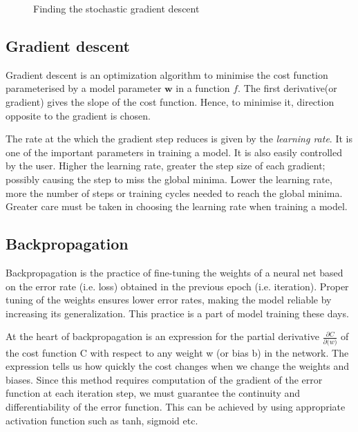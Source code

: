 \begin{figure}
	\centering
    \def\svgwidth{0.6\textwidth}
        
    \caption{Finding the stochastic gradient descent}
    \label{fig:gradientdescent}
\end{figure}


\subsection{Gradient descent}
\label{subsec:gradientdescent}
Gradient descent is an optimization algorithm to minimise the cost function parameterised by a
model parameter $\mathbf{w}$ in a function $f$. The first derivative(or gradient) gives the slope of the
cost function. Hence, to minimise it, direction opposite to the gradient is chosen.

The rate at the which the gradient step reduces is given by the \textit{learning rate}. It
is one of the important parameters in training a model. It is also easily controlled by
the user. Higher the learning rate, greater the step size of each gradient; possibly causing the
step to miss the global minima. Lower the learning rate, more the number of steps or training cycles
needed to reach the global minima. Greater care must be taken in choosing the learning
rate when training a model.

\subsection{Backpropagation}
\label{subsec:backpropagation}
Backpropagation is the practice of fine-tuning the weights of a neural net based on the error rate (i.e. loss) obtained in the previous epoch (i.e. iteration).
Proper tuning of the weights ensures lower error rates, making the model reliable by increasing its generalization.
This practice is a part of model training these days.

At the heart of backpropagation is an expression for the partial derivative
$\frac{\partial C}{\partial \mathbf(w)}$ of the cost function C with respect to any weight w (or bias b) in the network. The expression tells us how quickly the cost changes when we change the weights and biases.
Since this method requires computation of the gradient of the error function at each
iteration step, we must guarantee the continuity and differentiability of the error
function. This can be achieved by using appropriate activation function such as tanh,
sigmoid etc.


